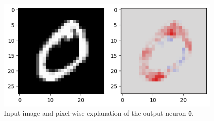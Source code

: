 \documentclass[twocolumn]{../cs-classes/cs-classes}
\newcommand*{\1}{\digitsbb{1}}
\newcommand*{\0}{\digitsbb{0}}
\begin{document}
\begin{figure}[H]
    \centering
    \includegraphics[width=.9\linewidth]{mnist-lrp.png}
    \caption{Input image and pixel-wise explanation of the output neuron \texttt{0}.}
    \label{fig:mnist-lrp}
\end{figure}
\end{document}
